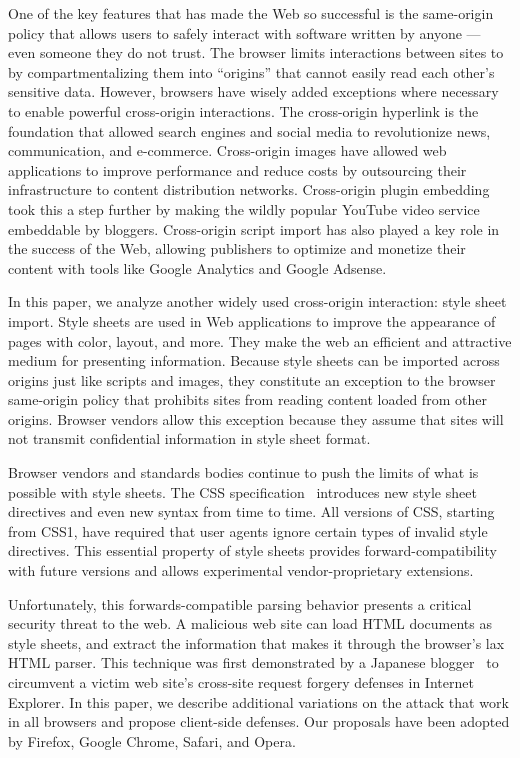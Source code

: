 \documentclass{acm_proc_article-sp}
\begin{document}
One of the key features that has made the Web so successful is the same-origin
policy that allows users to safely interact with software written by anyone
--- even someone they do not trust. The browser limits interactions between
sites to by compartmentalizing them into ``origins'' that cannot easily read
each other's sensitive data. However, browsers have wisely added exceptions
where necessary to enable powerful cross-origin interactions. The cross-origin
hyperlink is the foundation that allowed search engines and social media to
revolutionize news, communication, and e-commerce. Cross-origin images have
allowed web applications to improve performance and reduce costs by
outsourcing their infrastructure to content distribution networks.
Cross-origin plugin embedding took this a step further by making the wildly
popular YouTube video service embeddable by bloggers. Cross-origin script
import has also played a key role in the success of the Web, allowing
publishers to optimize and monetize their content with tools like Google
Analytics and Google Adsense.

In this paper, we analyze another widely used cross-origin interaction: style
sheet import. Style sheets are used in Web applications to improve the
appearance of pages with color, layout, and more. They make the web an
efficient and attractive medium for presenting information. Because style
sheets can be imported across origins just like scripts and images, they
constitute an exception to the browser same-origin policy that prohibits sites
from reading content loaded from other origins. Browser vendors allow this
exception because they assume that sites will not transmit confidential information in style sheet format.

Browser vendors and standards bodies continue to push the limits of what is
possible with style sheets. The CSS specification~\cite{cssspec} introduces
new style sheet directives and even new syntax from time to time. All versions
of CSS, starting from CSS1, have required that user agents ignore certain
types of invalid style directives. This essential property of style sheets
provides forward-compatibility with future versions and allows experimental
vendor-proprietary extensions.

Unfortunately, this forwards-compatible parsing behavior presents a critical
security threat to the web. A malicious web site can load HTML documents as
style sheets, and extract the information that makes it through the browser's
lax HTML parser. This technique was first demonstrated by a Japanese
blogger~\cite{cssxss} to circumvent a victim web site's cross-site request
forgery defenses in Internet Explorer. In this paper, we describe additional
variations on the attack that work in all browsers and propose client-side
defenses. Our proposals have been adopted by Firefox, Google Chrome, Safari,
and Opera.
\end{document}
